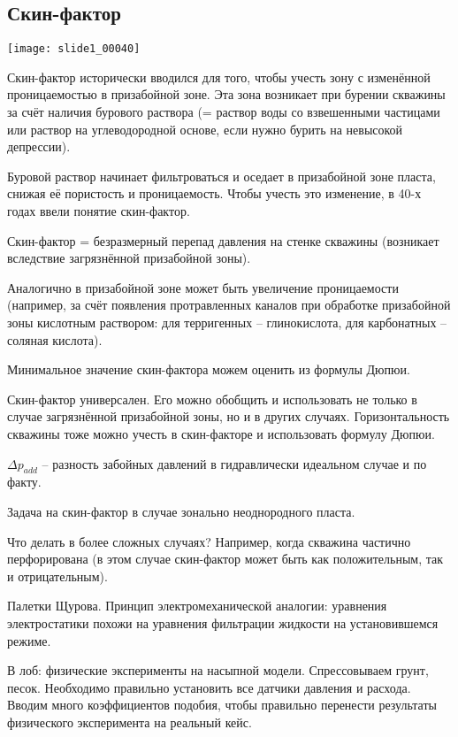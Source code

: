 \documentclass[main.tex]{subfiles}
\begin{document}
\subsection{Скин-фактор}

\texttt{[image: slide1\_00040]}

Скин-фактор исторически вводился для того, чтобы учесть зону с изменённой проницаемостью в призабойной зоне. Эта зона возникает при бурении скважины за счёт наличия бурового раствора (= раствор воды со взвешенными частицами или раствор на углеводородной основе, если нужно бурить на невысокой депрессии).

Буровой раствор начинает фильтроваться и оседает в призабойной зоне пласта, снижая её пористость и проницаемость. Чтобы учесть это изменение, в 40-х годах ввели понятие скин-фактор.

Скин-фактор = безразмерный перепад давления на стенке скважины (возникает вследствие загрязнённой призабойной зоны).

Аналогично в призабойной зоне может быть увеличение проницаемости (например, за счёт появления протравленных каналов при обработке призабойной зоны кислотным раствором: для терригенных  -- глинокислота, для карбонатных -- соляная кислота).

Минимальное значение скин-фактора можем оценить из формулы Дюпюи.


Скин-фактор универсален. Его можно обобщить и использовать не только в случае загрязнённой призабойной зоны, но и в других случаях. Горизонтальность скважины тоже можно учесть в скин-факторе и использовать формулу Дюпюи.

$\Delta p_{add}$ -- разность забойных давлений в гидравлически идеальном случае и по факту.


Задача на скин-фактор в случае зонально неоднородного пласта.


Что делать в более сложных случаях? Например, когда скважина частично перфорирована (в этом случае скин-фактор может быть как положительным, так и отрицательным).

Палетки Щурова. Принцип электромеханической аналогии: уравнения электростатики похожи на уравнения фильтрации жидкости на установившемся режиме.

В лоб: физические эксперименты на насыпной модели. Спрессовываем грунт, песок. Необходимо правильно установить все датчики давления и расхода. Вводим много коэффициентов подобия, чтобы правильно перенести результаты физического эксперимента на реальный кейс.
\end{document}
